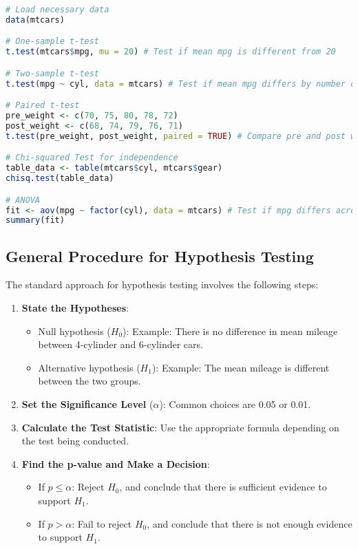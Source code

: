 \begin{lstlisting}[language=R, caption=Hypothesis Testing in R]
# Load necessary data
data(mtcars)

# One-sample t-test
t.test(mtcars$mpg, mu = 20) # Test if mean mpg is different from 20

# Two-sample t-test
t.test(mpg ~ cyl, data = mtcars) # Test if mean mpg differs by number of cylinders

# Paired t-test
pre_weight <- c(70, 75, 80, 78, 72)
post_weight <- c(68, 74, 79, 76, 71)
t.test(pre_weight, post_weight, paired = TRUE) # Compare pre and post weights

# Chi-squared Test for independence
table_data <- table(mtcars$cyl, mtcars$gear)
chisq.test(table_data)

# ANOVA
fit <- aov(mpg ~ factor(cyl), data = mtcars) # Test if mpg differs across cylinders
summary(fit)
\end{lstlisting}

\subsection{General Procedure for Hypothesis Testing}
The standard approach for hypothesis testing involves the following steps:

\begin{enumerate}
    \item \textbf{State the Hypotheses}:
    \begin{itemize}
        \item Null hypothesis (\(H_0\)): Example: There is no difference in mean mileage between 4-cylinder and 6-cylinder cars.
        \item Alternative hypothesis (\(H_1\)): Example: The mean mileage is different between the two groups.
    \end{itemize}

    \item \textbf{Set the Significance Level} (\(\alpha\)): Common choices are 0.05 or 0.01.

    \item \textbf{Calculate the Test Statistic}: Use the appropriate formula depending on the test being conducted.

    \item \textbf{Find the p-value and Make a Decision}:
    \begin{itemize}
        \item If \( p \leq \alpha \): Reject \(H_0\), and conclude that there is sufficient evidence to support \(H_1\).
        \item If \( p > \alpha \): Fail to reject \(H_0\), and conclude that there is not enough evidence to support \(H_1\).
    \end{itemize}
\end{enumerate}

